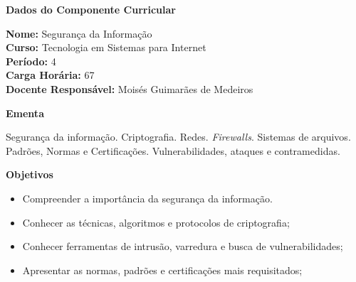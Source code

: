 

\begin{snugshade}\begin{center}\textbf{
    Dados do Componente Curricular
}\end{center}\end{snugshade}

\noindent \textbf{Nome:}                Segurança da Informação
\\        \textbf{Curso:}               Tecnologia em Sistemas para Internet
\\        \textbf{Período:}             \unit{4}{\degree}
\\        \textbf{Carga Horária:}       \unit{67}{\hour}
\\        \textbf{Docente Responsável:} Moisés Guimarães de Medeiros


\begin{snugshade}\begin{center}\textbf{
    Ementa
\vphantom{q}}\end{center}\end{snugshade}

\noindent
Segurança da informação. Criptografia. Redes. \textit{Firewalls}. Sistemas de arquivos. Padrões, Normas e Certificações. Vulnerabilidades, ataques e contramedidas.


\begin{snugshade}\begin{center}\textbf{
    Objetivos
}\end{center}\end{snugshade}

\begin{itemize}

\item Compreender a importância da segurança da informação.

\item Conhecer as técnicas, algoritmos e protocolos de criptografia;

\item Conhecer ferramentas de intrusão, varredura e busca de vulnerabilidades;

\item Apresentar as normas, padrões e certificações mais requisitados;

\end{itemize}


